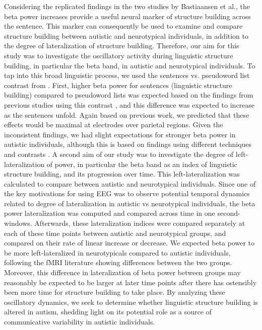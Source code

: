 Considering the replicated findings in the two studies by Bastiaansen et al., the beta power increases provide a useful neural marker of structure building across the sentence. This marker can consequently be used to examine and compare structure building between autistic and neurotypical individuals, in addition to the degree of lateralization of structure building. Therefore, our aim for this study was to investigate the oscillatory activity during linguistic structure building, in particular the beta band, in autistic and neurotypical individuals. To tap into this broad linguistic process, we used the sentences vs. pseudoword list contrast from \cite{jouravlev2020}. First, higher beta power for sentences (linguistic structure building) compared to pseudoword lists was expected based on the findings from previous studies using this contrast \citep{bastiaansen2010,bastiaansen2015}, and this difference was expected to increase as the sentences unfold. Again based on previous work, we predicted that these effects would be maximal at electrodes over parietal regions. Given the inconsistent findings, we had slight expectations for stronger beta power in autistic individuals, although this is based on findings using different techniques and contrasts \citep{philip2012}. A second aim of our study was to investigate the degree of left-lateralization of power, in particular the beta band as an index of linguistic structure building, and its progression over time. This left-lateralization was calculated to compare between autistic and neurotypical individuals. Since one of the key motivations for using EEG was to observe potential temporal dynamics related to degree of lateralization in autistic vs neurotypical individuals, the beta power lateralization was computed and compared across time in one second-windows. Afterwards, these lateralization  indices were compared separately at each of these time points between autistic and neurotypical groups, and compared on their rate of linear increase or decrease. We expected beta power to be more left-lateralized in neurotypicals compared to autistic individuals, following the fMRI literature showing differences between the two groups. Moreover, this difference in lateralization of beta power between groups may reasonably be expected to be larger at later time points after there has ostensibly been more time for structure building to take place. By analyzing these oscillatory dynamics, we seek to determine whether linguistic structure building is altered in autism, shedding light on its potential role as a source of communicative variability in autistic individuals.

